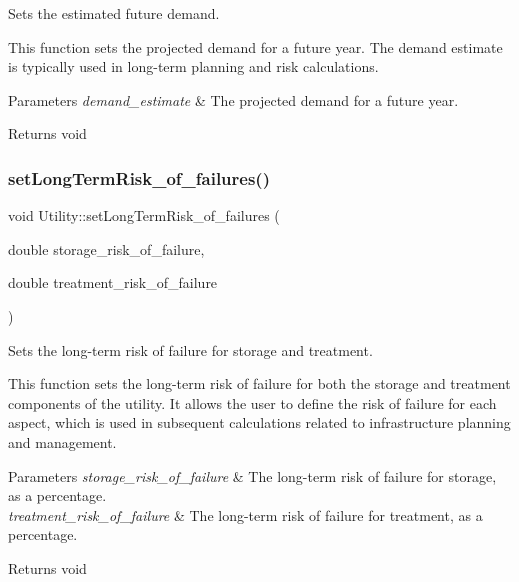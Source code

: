 Sets the estimated future demand. 

This function sets the projected demand for a future year. The demand estimate is typically used in long-\/term planning and risk calculations.


\begin{DoxyParams}{Parameters}
{\em demand\+\_\+estimate} & The projected demand for a future year.\\
\hline
\end{DoxyParams}
\begin{DoxyReturn}{Returns}
void 
\end{DoxyReturn}
\mbox{\label{classUtility_a0a5ccfc2e606ef46f1c1a52707fb5071}} 
\subsubsection{\texorpdfstring{set\+Long\+Term\+Risk\+\_\+of\+\_\+failures()}{setLongTermRisk\_of\_failures()}}
{\footnotesize\ttfamily void Utility\+::set\+Long\+Term\+Risk\+\_\+of\+\_\+failures (\begin{DoxyParamCaption}\item[{double}]{storage\+\_\+risk\+\_\+of\+\_\+failure,  }\item[{double}]{treatment\+\_\+risk\+\_\+of\+\_\+failure }\end{DoxyParamCaption})}



Sets the long-\/term risk of failure for storage and treatment. 

This function sets the long-\/term risk of failure for both the storage and treatment components of the utility. It allows the user to define the risk of failure for each aspect, which is used in subsequent calculations related to infrastructure planning and management.


\begin{DoxyParams}{Parameters}
{\em storage\+\_\+risk\+\_\+of\+\_\+failure} & The long-\/term risk of failure for storage, as a percentage. \\
\hline
{\em treatment\+\_\+risk\+\_\+of\+\_\+failure} & The long-\/term risk of failure for treatment, as a percentage.\\
\hline
\end{DoxyParams}
\begin{DoxyReturn}{Returns}
void 
\end{DoxyReturn}
\mbox{\label{classUtility_a6a89bff2044b4f68714ce9934344e2ad}} 
